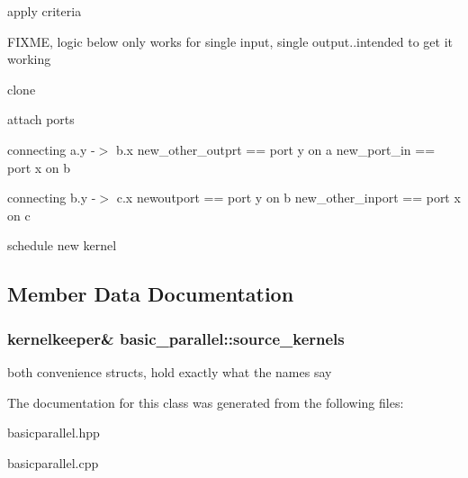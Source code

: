 apply criteria

F\+I\+X\+M\+E, logic below only works for single input, single output..intended to get it working

clone

attach ports

connecting a.\+y -\/$>$ b.\+x new\+\_\+other\+\_\+outprt == port y on a new\+\_\+port\+\_\+in == port x on b

connecting b.\+y -\/$>$ c.\+x newoutport == port y on b new\+\_\+other\+\_\+inport == port x on c

schedule new kernel 

\subsection{Member Data Documentation}
\hypertarget{classbasic__parallel_a969b8832b2f6eaea5e985d4582d9e4dc}{}
\subsubsection[{source\+\_\+kernels}]{\setlength{\rightskip}{0pt plus 5cm}kernelkeeper\& basic\+\_\+parallel\+::source\+\_\+kernels\hspace{0.3cm}{\ttfamily [protected]}}\label{classbasic__parallel_a969b8832b2f6eaea5e985d4582d9e4dc}
both convenience structs, hold exactly what the names say 

The documentation for this class was generated from the following files\+:\begin{DoxyCompactItemize}
\item 
basicparallel.\+hpp\item 
basicparallel.\+cpp\end{DoxyCompactItemize}
